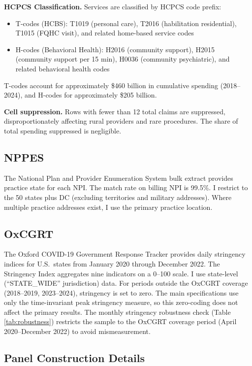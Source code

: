 \documentclass[12pt]{article}
\begin{document}
\textbf{HCPCS Classification.} Services are classified by HCPCS code prefix:
\begin{itemize}
\item T-codes (HCBS): T1019 (personal care), T2016 (habilitation residential), T1015 (FQHC visit), and related home-based service codes
\item H-codes (Behavioral Health): H2016 (community support), H2015 (community support per 15 min), H0036 (community psychiatric), and related behavioral health codes
\end{itemize}

T-codes account for approximately \$460 billion in cumulative spending (2018--2024), and H-codes for approximately \$205 billion.

\textbf{Cell suppression.} Rows with fewer than 12 total claims are suppressed, disproportionately affecting rural providers and rare procedures. The share of total spending suppressed is negligible.

\subsection{NPPES}

The National Plan and Provider Enumeration System bulk extract provides practice state for each NPI. The match rate on billing NPI is 99.5\%. I restrict to the 50 states plus DC (excluding territories and military addresses). Where multiple practice addresses exist, I use the primary practice location.

\subsection{OxCGRT}

The Oxford COVID-19 Government Response Tracker provides daily stringency indices for U.S.\ states from January 2020 through December 2022. The Stringency Index aggregates nine indicators on a 0--100 scale. I use state-level (``STATE\_WIDE'' jurisdiction) data. For periods outside the OxCGRT coverage (2018--2019, 2023--2024), stringency is set to zero. The main specifications use only the time-invariant peak stringency measure, so this zero-coding does not affect the primary results. The monthly stringency robustness check (Table \ref{tab:robustness}) restricts the sample to the OxCGRT coverage period (April 2020--December 2022) to avoid mismeasurement.

\subsection{Panel Construction Details}
\end{document}
